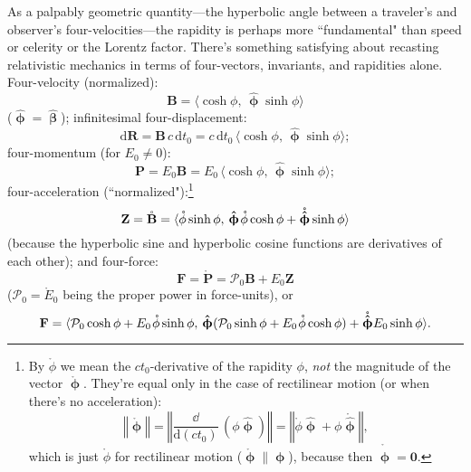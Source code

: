 \documentclass[12pt]{article}
\renewcommand{\vv}[1]{\mathbf{#1}}
\newcommand{\dd}[1]{\mathrm{d}#1}
\newcommand{\hatbeta}{\bm{\hat{\upbeta}}}
\newcommand{\vvphi}{\bm{\upphi}}
\newcommand{\hatphi}{\bm{\hat{\upphi}}}
\begin{document}
As a palpably geometric quantity---the hyperbolic angle between a traveler's and observer's four-velocities---the rapidity is perhaps more ``fundamental" than speed or celerity or the Lorentz factor. There's something satisfying about recasting relativistic mechanics in terms of four-vectors, invariants, and rapidities alone. Four-velocity (normalized):
\begin{equation*}
\vv B = \langle \cosh{\phi}, \, \hatphi \sinh{\phi} \rangle
\end{equation*}
($\hatphi = \hatbeta$); infinitesimal four-displacement:
\begin{equation*}
\dd \vv R = \vv B \, c \, \dd t_0 = c \, \dd t_0 \, \langle \cosh{\phi}, \, \hatphi \sinh{\phi} \rangle ;
\end{equation*}
four-momentum (for $E_0 \neq 0$):
\begin{equation*}
\vv P = E_0 \vv B = E_0 \, \langle \cosh{\phi}, \, \hatphi \sinh{\phi} \rangle ;
\end{equation*}
four-acceleration (``normalized"):\footnote{\label{fn:ph}By $\mathring{\phi}$ we mean the $ct_0$-derivative of the rapidity $\phi$, \emph{not} the magnitude of the vector $\mathring{\vvphi}$. They're equal only in the case of rectilinear motion (or when there's no acceleration):
\begin{equation*}
\left \Vert \mathring{\vvphi} \right \Vert = \left \Vert \dfrac{\dd}{\dd (c t_0)} \, ( \phi \hatphi ) \right \Vert = \left \Vert \mathring{\phi} \hatphi + \phi \mathring{\hatphi} \right \Vert,
\end{equation*}
which is just $\mathring{\phi}$ for rectilinear motion ($\mathring{\vvphi} \parallel \vvphi$), because then $\mathring{\hatphi} = \vv 0$.}
\begin{equation*}
\vv Z = \mathring{\vv B} = \langle  \mathring{\phi} \sinh{\phi} , \, \hatphi \mkern1.5mu \mathring{\phi} \cosh{\phi} + \mathring{\hatphi} \sinh{\phi} \rangle
\end{equation*}
(because the hyperbolic sine and hyperbolic cosine functions are derivatives of each other); and four-force:
\begin{equation*}
\vv F = \mathring{\vv P} = \mathcal{P}_0 \vv B + E_0 \vv Z
\end{equation*}
($\mathcal{P}_0 = \mathring{E}_0$ being the proper power in force-units), or
\begin{equation*}
\vv F = \langle \mathcal{P}_0 \cosh{\phi} + E_0 \mkern1.5mu \mathring{\phi} \sinh{\phi} , \, \hatphi ( \mathcal{P}_0 \sinh{\phi} + E_0 \mkern1.5mu \mathring{\phi} \cosh{\phi} ) + \mathring{\hatphi} E_0 \sinh{\phi} \rangle .
\end{equation*}
\end{document}
